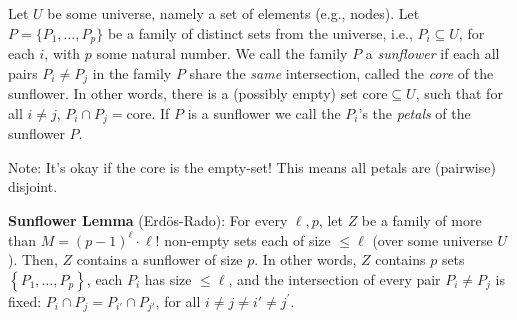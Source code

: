 
\begin{svgraybox}
\begin{definition}[Sunflower] Let $U$ be some universe, namely a set of elements (e.g., nodes). Let $P=\{P_1,\dots,P_p\}$ be a family of distinct sets from the universe, i.e., $P_i\subseteq U$, for each $i$, with $p$ some natural number. 
We call the family $P$ a \emph{sunflower} if each all pairs $P_i \neq P_j$ in the family $P$ share the \emph{same} intersection, called the \emph{core} of the sunflower.
In other words, there is a (possibly empty) set $\mathrm{core}\subseteq U$, such that for all $i\neq j$,  $ P_i\cap P_j = \mathrm{core}$.
If $P$ is a sunflower we call the $P_i$'s the \emph{petals} of the sunflower $P$.
\end{definition}
\end{svgraybox}
Note: It's okay if the core is the empty-set! This means all petals are (pairwise) disjoint.


\begin{svgraybox}
\textbf{Sunflower Lemma} (Erd\"os-Rado): For every $\ell, p$, let $Z$ be a family of more than $M=(p-1)^\ell \cdot \ell!$ non-empty sets each of size $\leqslant \ell$ (over some universe $U$). Then, $Z$ contains a sunflower of size $p$. In other words, $Z$ contains $p$ sets $\left\{P_1, \ldots, P_p\right\}$, each $P_i$ has size $\leqslant \ell$, and the intersection of every pair $P_i \neq P_j$ is fixed: $P_i \cap P_j=P_{i'} \cap P_{j'}$, for all $i \neq j \neq i' \neq j^{\prime}$.
\end{svgraybox}



